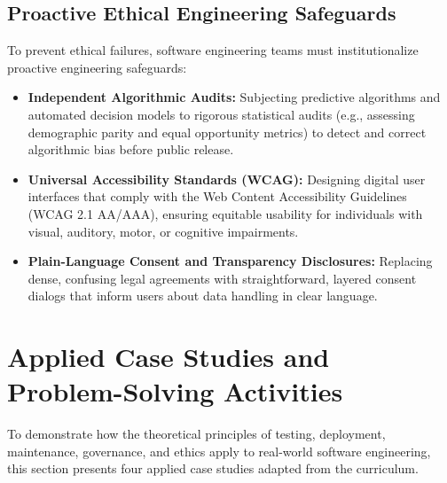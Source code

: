 \documentclass[11pt,a4paper]{article}
\begin{document}
\subsection{Proactive Ethical Engineering Safeguards}
To prevent ethical failures, software engineering teams must institutionalize proactive engineering safeguards:
\begin{itemize}
    \item \textbf{Independent Algorithmic Audits:} Subjecting predictive algorithms and automated decision models to rigorous statistical audits (e.g., assessing demographic parity and equal opportunity metrics) to detect and correct algorithmic bias before public release.
    \item \textbf{Universal Accessibility Standards (WCAG):} Designing digital user interfaces that comply with the Web Content Accessibility Guidelines (WCAG 2.1 AA/AAA), ensuring equitable usability for individuals with visual, auditory, motor, or cognitive impairments.
    \item \textbf{Plain-Language Consent and Transparency Disclosures:} Replacing dense, confusing legal agreements with straightforward, layered consent dialogs that inform users about data handling in clear language.
\end{itemize}

\section[Applied Case Studies]{Applied Case Studies and Problem-Solving Activities}
\label{sec:case_studies}

To demonstrate how the theoretical principles of testing, deployment, maintenance, governance, and ethics apply to real-world software engineering, this section presents four applied case studies adapted from the curriculum.
\end{document}
